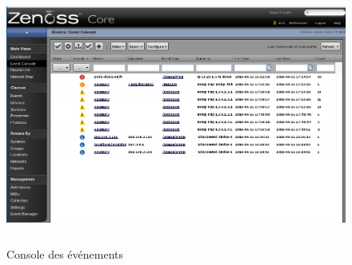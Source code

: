 \documentclass[12pt,a4paper,notitlepage]{article}
\begin{document}
\begin{figure}[!h]
\begin{center}
\includegraphics[height=8.5cm]{zenoss_console}
\caption{Console des événements}
\label{fig:da}
\end{center}
\end{figure}
\end{document}
